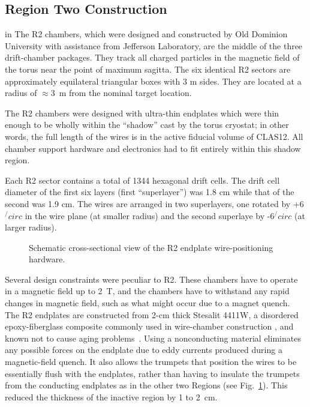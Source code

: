 
\subsection{Region Two Construction}

 in 
The R2 chambers, which were designed and constructed by Old Dominion University 
with assistance from Jefferson Laboratory, are the middle of the three  
drift-chamber packages.  They track all charged particles in the magnetic field 
of the torus near the point of maximum sagitta.  The six identical R2 sectors 
are approximately equilateral triangular boxes with 3 m sides. 
They are located at a radius of $\approx$3~m from the nominal target location.  
  
The R2 chambers were designed with ultra-thin endplates which were thin enough
to be wholly within the ``shadow'' cast by the torus cryostat; in other words,
the full length of the wires is in the active fiducial volume of CLAS12. 
All chamber support hardware and electronics had to fit 
entirely within this shadow region.

Each R2 sector contains a total of 1344 hexagonal drift cells.  The drift cell
diameter of the first six layers (first ``superlayer'') was 1.8 cm while that
of the second was 1.9 cm.   The 
wires are arranged in two superlayers, one rotated by +6$^/circ$ in the wire plane 
(at smaller radius) and the second superlaye by -6$^/circ$ (at larger radius).  

\begin{figure}[htpb]   
\vspace{6.0cm}
\caption{\small{Schematic cross-sectional view of the R2 endplate 
wire-positioning hardware.}} 
\label{r2_inserts}
\end{figure}   



Several design constraints were peculiar to R2.  These chambers have to operate 
in a magnetic field up to 2~T, and the chambers have to withstand any rapid 
changes in magnetic field, such as what might occur due to a magnet quench.
The R2 endplates are constructed from 2-cm thick Stesalit 4411W, a disordered 
epoxy-fiberglass composite commonly used in wire-chamber construction
\cite{stesalit}, and known not to cause aging problems~\cite{stesalitaging}.  
Using a nonconducting material eliminates any possible forces on the endplate 
due to eddy currents produced during a magnetic-field quench.  It also allows 
the trumpets that position the wires to be essentially flush with the endplates, 
rather than having to insulate the trumpets from the conducting endplates as in 
the other two Regions (see Fig.~\ref{r2_inserts}).  This reduced the thickness of 
the inactive region by 1 to 2~cm.




 
